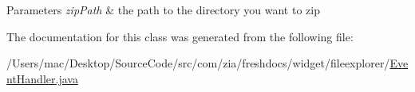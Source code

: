 \begin{DoxyParams}{Parameters}
{\em zip\-Path} & the path to the directory you want to zip \\
\hline
\end{DoxyParams}


The documentation for this class was generated from the following file\-:\begin{DoxyCompactItemize}
\item 
/\-Users/mac/\-Desktop/\-Source\-Code/src/com/zia/freshdocs/widget/fileexplorer/\hyperlink{_event_handler_8java}{Event\-Handler.\-java}\end{DoxyCompactItemize}
